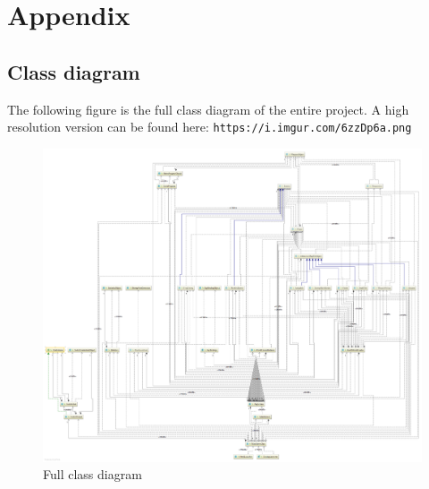 \documentclass[12p]{article}
\begin{document}

\newpage
\printbibliography[heading=bibintoc,title={References}]


\newpage
\appendix

\section{Appendix}

\subsection{Class diagram} \label{AppendixClassDiagramFull}

The following figure is the full class diagram of the entire project. A high resolution version can be found here: \texttt{https://i.imgur.com/6zzDp6a.png}

\begin{figure}[ht]
  \centering
  \includegraphics[width=1\textwidth]{Documentation/class_diagram}
  \caption{Full class diagram}
  \label{fig:ClassDiagramFull}
\end{figure}
\end{document}
